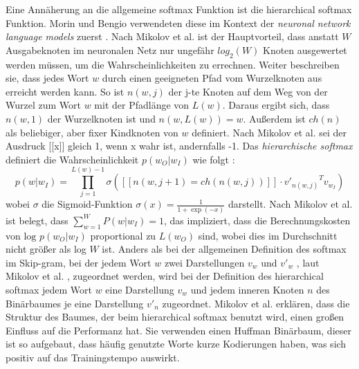 \documentclass[12pt,a4paper]{report}
\begin{document}
Eine Annäherung an die allgemeine softmax Funktion ist die hierarchical softmax Funktion. Morin und Bengio verwendeten diese im Kontext der \textit{neuronal network language models} zuerst \cite{morin2005hierarchical}. Nach Mikolov et al. \cite{DBLP:journals/corr/MikolovSCCD13} ist der Hauptvorteil, dass anstatt $W$ Ausgabeknoten im neuronalen Netz nur ungefähr $log_2(W) $ Knoten ausgewertet werden müssen, um die Wahrscheinlichkeiten zu errechnen. Weiter beschreiben sie, dass jedes Wort $w$ durch einen geeigneten Pfad vom Wurzelknoten aus erreicht werden kann. So ist $n(w,j)$ der j-te Knoten auf dem Weg von der Wurzel zum Wort $w$ mit der Pfadlänge von $L(w)$. Daraus ergibt sich, dass $n(w,1)$ der Wurzelknoten ist und $n(w,L(w))=w$. Außerdem ist $ch(n)$ als beliebiger, aber fixer Kindknoten von $w$ definiert\citep{DBLP:journals/corr/MikolovSCCD13}. Nach Mikolov et al. \cite{DBLP:journals/corr/MikolovSCCD13} sei der Ausdruck [[x]]  gleich 1, wenn x wahr ist, andernfalls -1. Das \textit{hierarchische softmax} definiert die Wahrscheinlichkeit $p(w_O|w_I)$ wie folgt \cite{DBLP:journals/corr/MikolovSCCD13}:\\
 \begin{equation}
p(w|w_I)=  \prod_{j=1}^{L(w)-1} \sigma([[n(w,j+1) = ch(n(w,j))]]\cdot {v'_{n(w,j)}}^T v_{w_I } )
  \end{equation}
  wobei $\sigma$ die Sigmoid-Funktion $\sigma(x)=\frac{1}{1+\exp(-x)} $ darstellt.
Nach Mikolov et al. \cite{DBLP:journals/corr/MikolovSCCD13} ist belegt, dass $\sum_{w=1}^W P(w|w_I) = 1$, das impliziert, dass die Berechnungskosten von $\textrm{log } p(w_O|w_I)$ proportional zu $L(w_O)$ sind, wobei dies im Durchschnitt nicht größer als log $W$ ist. Anders als bei der allgemeinen Definition des softmax im Skip-gram, bei der jedem Wort $w$ zwei Darstellungen $v_w$ und $v'_w$ , laut Mikolov et al. \citep{DBLP:journals/corr/MikolovSCCD13}, zugeordnet werden, wird bei der Definition des hierarchical softmax jedem Wort $w$ eine Darstellung  $v_w$ und jedem inneren Knoten $n$ des Binärbaumes je eine Darstellung $v'_n$ zugeordnet.
Mikolov et al. \cite{DBLP:journals/corr/MikolovSCCD13} erklären, dass die Struktur des Baumes, der beim hierarchical softmax benutzt wird, einen großen Einfluss auf die Performanz hat. Sie verwenden einen Huffman Binärbaum, dieser ist so aufgebaut, dass häufig genutzte Worte kurze Kodierungen haben, was sich positiv auf das Trainingstempo auswirkt.\\
\end{document}
